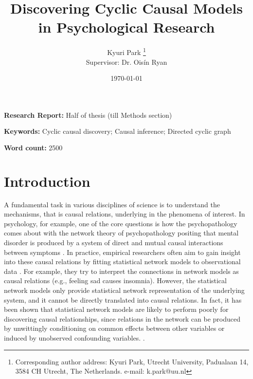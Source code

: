 \documentclass[11pt]{article}
\title{Discovering Cyclic Causal Models in Psychological Research 
}
\author[1]{\Large{Kyuri Park \thanks{Corresponding author address: Kyuri Park, Utrecht University, Padualaan 14, 3584 CH Utrecht, The Netherlands. e-mail: k.park@uu.nl}}\\
\large{Supervisor: Dr. Ois\'{i}n Ryan}}
\affil[1]{Department of Methodology and Statistics, Utrecht University}
\date{\today}
\theoremstyle{definition}
\begin{document}
{
\maketitle

\noindent\textbf{Research Report: }%
Half of thesis (till Methods section)


\noindent\textbf{Keywords: }%
Cyclic causal discovery; Causal inference; Directed cyclic graph} 


\noindent\textbf{Word count: }%
2500
\\


\section{Introduction}
A fundamental task in various disciplines of science is to understand the mechanisms, that is causal relations, underlying in the phenomena of interest. In psychology, for example, one of the core questions is how the psychopathology comes about with the network theory of psychopathology positing that mental disorder is produced by a system of direct and mutual causal interactions between symptoms \citep{BorsboomCramer2013}. In practice, empirical researchers often aim to gain insight into these causal relations by fitting statistical network models to observational data \citep{robinaugh2020}. For example, they try to interpret the connections in network models as causal relations (e.g., feeling sad causes insomnia). However, the statistical network models only provide statistical network representation of the underlying system, and it cannot be directly translated into causal relations. In fact, it has been shown that statistical network models are likely to perform poorly for discovering causal relationships, since relations in the network can be produced by unwittingly conditioning on common effects between other variables or induced by unobserved confounding variables. \citep{Ryan2022}.
\end{document}
